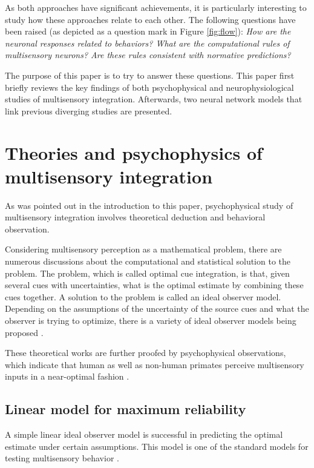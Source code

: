 \documentclass{article}[11pt]
\begin{document}
As both approaches have significant achievements, it is particularly interesting to study how these approaches relate to each other. The following questions have been raised (as depicted as a question mark in Figure \ref{fig:flow}): \emph{How are the neuronal responses related to behaviors? What are the computational rules of multisensory neurons? Are these rules consistent with normative predictions?} 

The purpose of this paper is to try to answer these questions. This paper first briefly reviews the key findings of both psychophysical and neurophysiological studies of multisensory integration. Afterwards, two neural network models that link previous diverging studies are presented.

\section{Theories and psychophysics of multisensory integration}
As was pointed out in the introduction to this paper, psychophysical study of multisensory integration involves theoretical deduction and behavioral observation.

Considering multisensory perception as a mathematical problem, there are numerous discussions about the computational and statistical solution to the problem. The problem, which is called optimal cue integration, is that, given several cues with uncertainties, what is the optimal estimate by combining these cues together. A solution to the problem is called an ideal observer model. Depending on the assumptions of the uncertainty of the source cues and what the observer is trying to optimize, there is a variety of ideal observer models being proposed \cite{landy_ideal-observer_2011}.

These theoretical works are further proofed by psychophysical observations, which indicate that human as well as non-human primates perceive multisensory inputs in a near-optimal fashion \cite{ernst_humans_2002,alais_ventriloquist_2004,gu_neural_2008}.

\subsection{Linear model for maximum reliability}
A simple linear ideal observer model is successful in predicting the optimal estimate under certain assumptions. This model is one of the standard models for testing multisensory behavior \cite{landy_ideal-observer_2011}.
\end{document}
